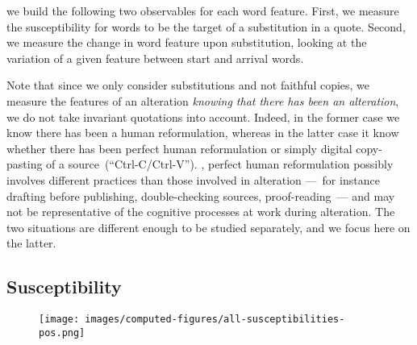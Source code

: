  we build the following two observables for each word feature.
First, we measure  the susceptibility for words to be the target of a substitution in a quote.
Second, we measure the change in word feature upon substitution, looking at the variation of a given feature between start and arrival words.

Note that since we only consider substitutions and not faithful copies, we measure the features of an alteration \emph{knowing that there has been an alteration},  we do not take invariant quotations into account.
Indeed, in the former case we know there has been a human reformulation, whereas in the latter case it  know whether there has been perfect human reformulation or simply digital copy-pasting of a source~(``{\sc Ctrl-C}/{\sc Ctrl-V}'').
, perfect human reformulation possibly involves different practices than those involved in alteration ---~for instance drafting before publishing, double-checking sources, proof-reading~--- and may not be representative of the cognitive processes at work during alteration.
The two situations are different enough to be studied separately, and we focus here on the latter.

\subsection{Susceptibility}

\begin{figure}[h]
    \centering
    \texttt{[image: images/computed-figures/all-susceptibilities-pos.png]}
    \caption{
    }
    \label{fig:pos-susceptibilities}
\end{figure}


